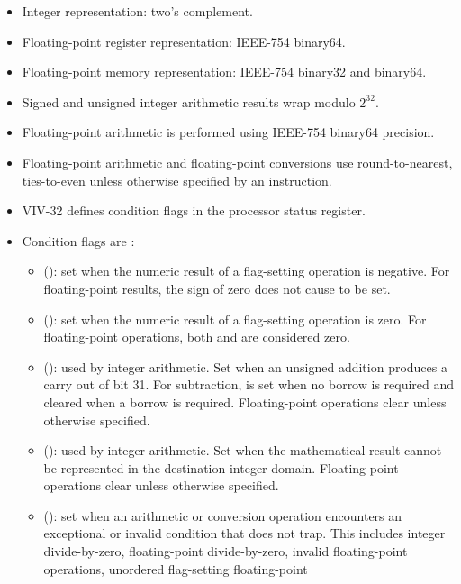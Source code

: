 \begin{itemize}
\item Integer representation: two's complement.
\item Floating-point register representation: IEEE-754 binary64.
\item Floating-point memory representation: IEEE-754 binary32 and binary64.
\item Signed and unsigned integer arithmetic results wrap modulo \(2^{32}\).
\item Floating-point arithmetic is performed using IEEE-754 binary64 precision.
\item Floating-point arithmetic and floating-point conversions use
      round-to-nearest, ties-to-even unless otherwise specified by an
      instruction.
\item VIV-32 defines condition flags in the processor status register.
\item Condition flags are :
      \begin{itemize}
      \item {} (): set when the numeric result of a
            flag-setting operation is negative. For floating-point results,
            the sign of zero does not cause  to be set.
      \item {} (): set when the numeric result of a
            flag-setting operation is zero. For floating-point operations,
            both  and  are considered zero.
      \item {} (): used by integer arithmetic. Set when an
            unsigned addition produces a carry out of bit 31. For subtraction,
             is set when no borrow is required and cleared when a borrow
            is required. Floating-point operations clear  unless otherwise
            specified.
      \item {} (): used by integer arithmetic. Set when
            the mathematical result cannot be represented in the destination
            integer domain. Floating-point operations clear  unless
            otherwise specified.
      \item {} (): set when an arithmetic or
            conversion operation encounters an exceptional or invalid
            condition that does not trap. This includes integer
            divide-by-zero, floating-point divide-by-zero, invalid
            floating-point operations, unordered flag-setting floating-point

\end{itemize}
\end{itemize}
